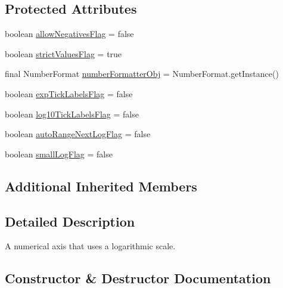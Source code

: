 \subsection*{Protected Attributes}
\begin{DoxyCompactItemize}
\item 
boolean \mbox{\hyperlink{classorg_1_1jfree_1_1chart_1_1axis_1_1_logarithmic_axis_af0b74ed81ba9354ffcc106765b2d386f}{allow\+Negatives\+Flag}} = false
\item 
boolean \mbox{\hyperlink{classorg_1_1jfree_1_1chart_1_1axis_1_1_logarithmic_axis_a189a8bc6700ef138f70483cc689ee4ed}{strict\+Values\+Flag}} = true
\item 
final Number\+Format \mbox{\hyperlink{classorg_1_1jfree_1_1chart_1_1axis_1_1_logarithmic_axis_a91e315bd3448cafc2b92ef3c8d5162f1}{number\+Formatter\+Obj}} = Number\+Format.\+get\+Instance()
\item 
boolean \mbox{\hyperlink{classorg_1_1jfree_1_1chart_1_1axis_1_1_logarithmic_axis_a6683d6eeeb3b87a774fab7a116ba6ce2}{exp\+Tick\+Labels\+Flag}} = false
\item 
boolean \mbox{\hyperlink{classorg_1_1jfree_1_1chart_1_1axis_1_1_logarithmic_axis_a7c77be2e2034cba010c0921673593ca0}{log10\+Tick\+Labels\+Flag}} = false
\item 
boolean \mbox{\hyperlink{classorg_1_1jfree_1_1chart_1_1axis_1_1_logarithmic_axis_a31c19519e78380c3ab3f1f12b940f75b}{auto\+Range\+Next\+Log\+Flag}} = false
\item 
boolean \mbox{\hyperlink{classorg_1_1jfree_1_1chart_1_1axis_1_1_logarithmic_axis_a4299adc24122e2dd353527efb82e124c}{small\+Log\+Flag}} = false
\end{DoxyCompactItemize}
\subsection*{Additional Inherited Members}


\subsection{Detailed Description}
A numerical axis that uses a logarithmic scale. 

\subsection{Constructor \& Destructor Documentation}
\mbox{\label{classorg_1_1jfree_1_1chart_1_1axis_1_1_logarithmic_axis_ad1f0c2536d888aa21b60bf33b30181c4}} 
